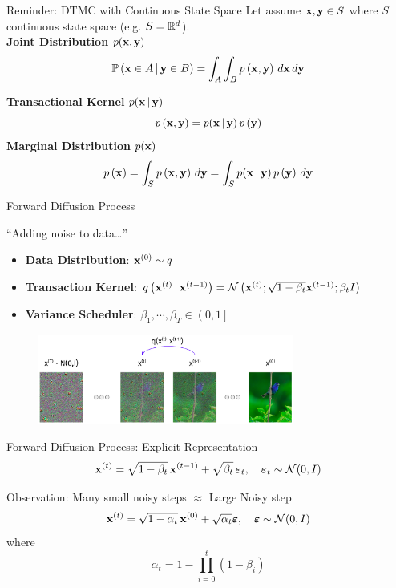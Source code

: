 \documentclass[aspectratio=169, 10pt]{beamer}
\theoremstyle{definition}
\begin{document}
\begin{frame}{Reminder: DTMC with Continuous State Space}
  Let assume ${\mathbf{x}},{\mathbf{y}}\in S$ where $S$ continuous state space (e.g.
  $S=\mathbb{R}^d$).\\
  \vfill
  \textbf{Joint Distribution} $p({\mathbf{x}},{\mathbf{y}})$
  \[
    \mathbb{P}\left( {\mathbf{x}}\in A\,\vert\,{\mathbf{y}}\in B \right)=
    \int_A\int_B p\left( {\mathbf{x}},{\mathbf{y}} \right)\,d{\mathbf{x}}\,d{\mathbf{y}}
  \]

  \textbf{Transactional Kernel} $p({\mathbf{x}}\,\vert\,{\mathbf{y}})$
  \[
    p\left( {\mathbf{x}},{\mathbf{y}} \right) = p({\mathbf{x}}\,\vert\,{\mathbf{y}})\,p\left( {\mathbf{y}} \right)
  \]
  \textbf{Marginal Distribution} $p({\mathbf{x}})$
  \[
    p\left( {\mathbf{x}} \right)=\int_S p\left( {\mathbf{x}},{\mathbf{y}} \right)\,d{\mathbf{y}} = \int_S
    p({\mathbf{x}}\,\vert\,{\mathbf{y}})\,p\left( {\mathbf{y}}\right)\,d{\mathbf{y}} 
  \]

\end{frame}
\begin{frame}{Forward Diffusion Process}
  \begin{center}
    ``Adding noise to data\ldots''
  \end{center}
  \begin{itemize}
    \item \textbf{Data Distribution}: ${\mathbf{x}}^{(0)}\sim q$
      \hfill{}
    \item \textbf{Transaction Kernel}: $q\left( {\mathbf{x}}^{(t)}\,\vert\,{\mathbf{x}}^{(t-1)}
      \right)=\mathcal{N}\left( {\mathbf{x}}^{(t)};\sqrt{1-\beta_t}{\mathbf{x}}^{(t-1)}; \beta_t I \right)$
    \item \textbf{Variance Scheduler}: $\beta_1,\cdots,\beta_T\in\left(
      0,1\right]$ \hfill{}

  \end{itemize}
  \begin{figure}[h!]
    \centering
    \includegraphics[width=0.75\textwidth]{./pic/forward-diffusion.png}
  \end{figure}
\end{frame}
\begin{frame}{Forward Diffusion Process: Explicit Representation}
  \[
    {\mathbf{x}}^{(t)}=\sqrt{1-\beta_t}\,{\mathbf{x}}^{(t-1)} +
    \sqrt{\beta_t}\,{\boldsymbol{\varepsilon}}_t,\quad
    {\boldsymbol{\varepsilon}}_t\sim\mathcal{N}(0,I)
  \]
  \begin{block}{Observation: Many small noisy steps $\approx$ Large Noisy
    step}
    \[
      {\mathbf{x}}^{(t)} = \sqrt{1-\alpha_t}\, {\mathbf{x}}^{(0)} + \sqrt{\alpha_t}
      {\boldsymbol{\varepsilon}},\quad {\boldsymbol{\varepsilon}}\sim\mathcal{N}(0,I)
    \]
    where
    \[
      \alpha_t = 1-\prod_{i=0}^t(1-\beta_i)
    \]
  \end{block}
\end{frame}
\end{document}
